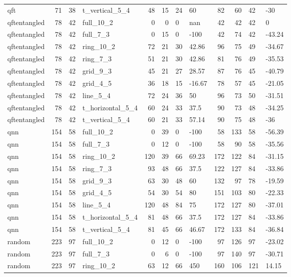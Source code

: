\begin{longtable}{lrrlrrllrrll}
qft & 71 & 38 & t\_vertical\_5\_4 & 48 & 15 & 24 & 60 & 82 & 60 & 42 & -30 \\
qftentangled & 78 & 42 & full\_10\_2 & 0 & 0 & 0 & nan & 42 & 42 & 42 & 0 \\
qftentangled & 78 & 42 & full\_7\_3 & 0 & 15 & 0 & -100 & 42 & 74 & 42 & -43.24 \\
qftentangled & 78 & 42 & ring\_10\_2 & 72 & 21 & 30 & 42.86 & 96 & 75 & 49 & -34.67 \\
qftentangled & 78 & 42 & ring\_7\_3 & 51 & 21 & 30 & 42.86 & 81 & 76 & 49 & -35.53 \\
qftentangled & 78 & 42 & grid\_9\_3 & 45 & 21 & 27 & 28.57 & 87 & 76 & 45 & -40.79 \\
qftentangled & 78 & 42 & grid\_4\_5 & 36 & 18 & 15 & -16.67 & 78 & 57 & 45 & -21.05 \\
qftentangled & 78 & 42 & line\_5\_4 & 72 & 24 & 36 & 50 & 96 & 73 & 50 & -31.51 \\
qftentangled & 78 & 42 & t\_horizontal\_5\_4 & 60 & 24 & 33 & 37.5 & 90 & 73 & 48 & -34.25 \\
qftentangled & 78 & 42 & t\_vertical\_5\_4 & 60 & 21 & 33 & 57.14 & 90 & 75 & 48 & -36 \\
qnn & 154 & 58 & full\_10\_2 & 0 & 39 & 0 & -100 & 58 & 133 & 58 & -56.39 \\
qnn & 154 & 58 & full\_7\_3 & 0 & 12 & 0 & -100 & 58 & 90 & 58 & -35.56 \\
qnn & 154 & 58 & ring\_10\_2 & 120 & 39 & 66 & 69.23 & 172 & 122 & 84 & -31.15 \\
qnn & 154 & 58 & ring\_7\_3 & 93 & 48 & 66 & 37.5 & 122 & 127 & 84 & -33.86 \\
qnn & 154 & 58 & grid\_9\_3 & 63 & 30 & 48 & 60 & 132 & 97 & 78 & -19.59 \\
qnn & 154 & 58 & grid\_4\_5 & 54 & 30 & 54 & 80 & 151 & 103 & 80 & -22.33 \\
qnn & 154 & 58 & line\_5\_4 & 120 & 48 & 84 & 75 & 172 & 127 & 80 & -37.01 \\
qnn & 154 & 58 & t\_horizontal\_5\_4 & 81 & 48 & 66 & 37.5 & 172 & 127 & 84 & -33.86 \\
qnn & 154 & 58 & t\_vertical\_5\_4 & 81 & 45 & 66 & 46.67 & 172 & 133 & 84 & -36.84 \\
random & 223 & 97 & full\_10\_2 & 0 & 12 & 0 & -100 & 97 & 126 & 97 & -23.02 \\
random & 223 & 97 & full\_7\_3 & 0 & 6 & 0 & -100 & 97 & 140 & 97 & -30.71 \\
random & 223 & 97 & ring\_10\_2 & 63 & 12 & 66 & 450 & 160 & 106 & 121 & 14.15 \\

\end{longtable}
